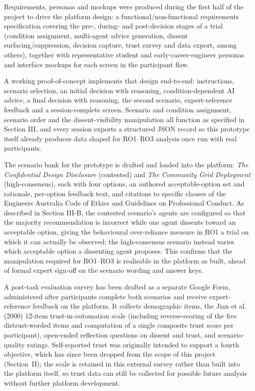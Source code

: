\documentclass[conference]{IEEEtran}
\begin{document}
Requirements, personas and mockups were produced during the first half of the project to drive the platform design: a functional/non-functional requirements specification covering the pre-, during- and post-decision stages of a trial (condition assignment, multi-agent advice generation, dissent surfacing/suppression, decision capture, trust survey and data export, among others), together with representative student and early-career-engineer personas and interface mockups for each screen in the participant flow.

A working proof-of-concept implements that design end-to-end: instructions, scenario selection, an initial decision with reasoning, condition-dependent AI advice, a final decision with reasoning, the second scenario, expert-reference feedback and a session-complete screen. Scenario and condition assignment, scenario order and the dissent-visibility manipulation all function as specified in Section III, and every session exports a structured JSON record so this prototype itself already produces data shaped for RO1--RO3 analysis once run with real participants.

The scenario bank for the prototype is drafted and loaded into the platform: \textit{The Confidential Design Disclosure} (contested) and \textit{The Community Grid Deployment} (high-consensus), each with four options, an authored acceptable-option set and rationale, per-option feedback text, and citations to specific clauses of the Engineers Australia Code of Ethics and Guidelines on Professional Conduct. As described in Section III-B, the contested scenario's agents are configured so that the majority recommendation is incorrect while one agent dissents toward an acceptable option, giving the behavioural over-reliance measure in RO1 a trial on which it can actually be observed; the high-consensus scenario instead varies which acceptable option a dissenting agent proposes. This confirms that the manipulation required for RO1--RO3 is realisable in the platform as built, ahead of formal expert sign-off on the scenario wording and answer keys.

A post-task evaluation survey has been drafted as a separate Google Form, administered after participants complete both scenarios and receive expert-reference feedback on the platform. It collects demographic items, the Jian et al. (2000) 12-item trust-in-automation scale (including reverse-scoring of the five distrust-worded items and computation of a single composite trust score per participant), open-ended reflection questions on dissent and trust, and scenario-quality ratings. Self-reported trust was originally intended to support a fourth objective, which has since been dropped from the scope of this project (Section~II); the scale is retained in this external survey rather than built into the platform itself, so trust data can still be collected for possible future analysis without further platform development.
\end{document}

